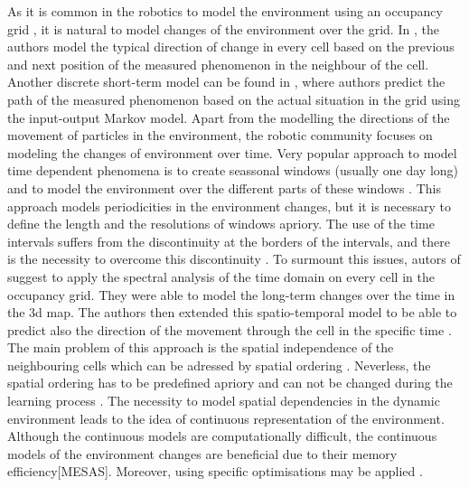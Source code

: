 As it is common in the robotics to model the environment using an occupancy grid \cite{elfes1989using}, it is natural to model changes of the environment over the grid.
In \cite{kucner2013conditional}, the authors model the typical direction of change in every cell based on the previous and next position of the measured phenomenon in the neighbour of the cell. 
Another discrete short-term model can be found in \cite{wang2014modeling}, where authors predict the path of the measured phenomenon based on the actual situation in the grid using the input-output Markov model.
Apart from the modelling the directions of the movement of particles in the environment, the robotic community focuses on modeling the changes of environment over time.
Very popular approach to model time dependent phenomena is to create seassonal windows (usually one day long) and to model the environment over the different parts of these windows \cite{Van2008Using,Blanke2009Daily}.
This approach models periodicities in the environment changes, but it is necessary to define the length and the resolutions of windows apriory.
The use of the time intervals suffers from the discontinuity at the borders of the intervals, and there is the necessity to overcome this discontinuity \cite{chinellato2017incremental}.
To surmount this issues, autors of \cite{krajnik2017fremen} suggest to apply the spectral analysis of the time domain on every cell in the occupancy grid. 
They were able to model the long-term changes over the time \cite{Krajnik2014Longterm} in the 3d map\cite{Krajnik2014Froctomap}.
The authors then extended this spatio-temporal model to be able to predict also the direction of the movement through the cell in the specific time \cite{molina2018modelling}.
The main problem of this approach is the spatial independence of the neighbouring cells which can be adressed by spatial ordering \cite{Cliff1975Model}.
Neverless, the spatial ordering has to be predefined apriory and can not be changed during the learning process \cite{Shi2018Machine}.
The necessity to model spatial dependencies in the dynamic environment leads to the idea of continuous representation of the environment.
Although the continuous models are computationally difficult, the continuous models of the environment changes are beneficial due to their memory efficiency\cite{o2012gaussian}[MESAS].
Moreover, using specific optimisations may be applied \cite{ramos2016hilbert}.


